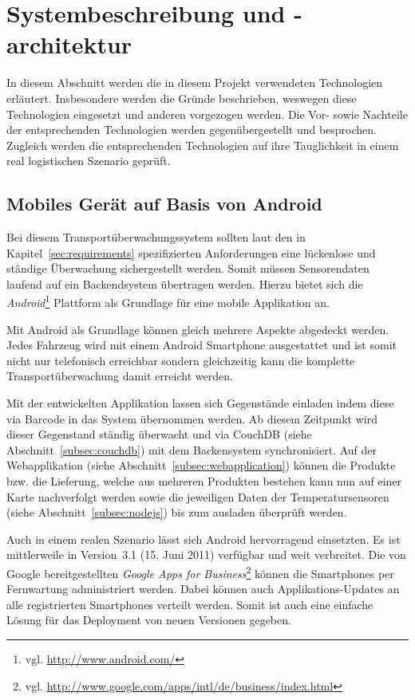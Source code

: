\section{Systembeschreibung und -architektur}
\label{sec:system}

In diesem Abschnitt werden die in diesem Projekt verwendeten Technologien
	erläutert. Insbesondere werden die Gründe beschrieben, weswegen diese
	Technologien eingesetzt und anderen vorgezogen werden. Die Vor- sowie
	Nachteile der entsprechenden Technologien werden gegenübergestellt und
	besprochen. Zugleich werden die entsprechenden Technologien auf ihre
	Tauglichkeit in einem real logistischen Szenario geprüft.

\subsection{Mobiles Gerät auf Basis von Android}

Bei diesem Transportüberwachungssystem sollten laut den in
	Kapitel~\ref{sec:requirements} spezifizierten Anforderungen eine lückenlose
	und ständige Überwachung sichergestellt werden. Somit müssen Sensorendaten
	laufend auf ein Backendsystem übertragen werden. Hierzu bietet sich
	die \emph{Android}\footnote{vgl. \url{http://www.android.com/}} Plattform
	als Grundlage für eine mobile Applikation an.
	
Mit Android als Grundlage können gleich mehrere Aspekte abgedeckt werden. Jedes
	Fahrzeug wird mit einem Android Smartphone ausgestattet und ist somit nicht
	nur telefonisch erreichbar sondern gleichzeitig kann die komplette
	Transportüberwachung damit erreicht werden.
	
Mit der entwickelten Applikation lassen sich Gegenstände einladen indem diese
	via Barcode in das System übernommen werden. Ab diesem Zeitpunkt wird dieser
	Gegenstand ständig überwacht und via CouchDB (siehe Abschnitt~\ref{subsec:couchdb})
	mit dem Backensystem synchronisiert. Auf der Webapplikation (siehe
	Abschnitt~\ref{subsec:webapplication}) können die Produkte bzw. die Lieferung,
	welche aus mehreren Produkten bestehen kann nun auf einer Karte	nachverfolgt
	werden sowie die jeweiligen Daten der Temperatursensoren (siehe
	Abschnitt~\ref{subsec:nodejs}) bis zum ausladen überprüft werden.
		
Auch in einem realen Szenario lässt sich Android hervorragend einsetzten. Es ist
	mittlerweile in Version~3.1 (15. Juni 2011) verfügbar und weit verbreitet.
	Die von Google bereitgestellten \emph{Google Apps for Business}\footnote{vgl.
	\url{http://www.google.com/apps/intl/de/business/index.html}} können die
	Smartphones per Fernwartung administriert werden. Dabei können auch
	Applikations-Updates an alle registrierten Smartphones verteilt werden.
	Somit ist auch eine einfache Lösung für das Deployment von neuen Versionen
	gegeben.
	
